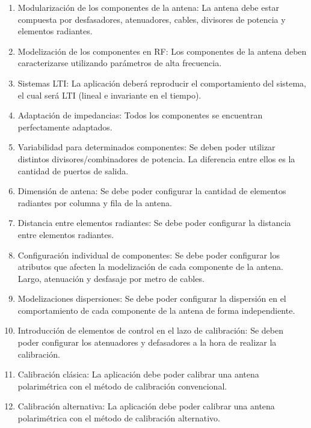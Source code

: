 \begin{enumerate}
    \item Modularización de los componentes de la antena: La antena debe estar compuesta por desfasadores, atenuadores, cables,
		divisores de potencia y elementos radiantes.

	\item Modelización de los componentes en RF: Los componentes de la antena deben caracterizarse utilizando parámetros de alta
		frecuencia.

    \item Sistemas LTI: La aplicación deberá reproducir el comportamiento del sistema, el cual será LTI (lineal e invariante
		en el tiempo).

	\item Adaptación de impedancias: Todos los componentes se encuentran perfectamente adaptados.

    \item Variabilidad para determinados componentes: Se deben poder utilizar distintos divisores/combinadores de potencia.
		La diferencia entre ellos es la cantidad de puertos de salida.

    \item Dimensión de antena: Se debe poder configurar la cantidad de elementos radiantes por columna y fila de la antena.
    \item Distancia entre elementos radiantes: Se debe poder configurar la distancia entre elementos radiantes.
    \item Configuración individual de componentes: Se debe poder configurar los atributos que afecten la modelización de cada
		componente de la antena. Largo, atenuación y desfasaje por metro de cables.

    \item Modelizaciones dispersiones: Se debe poder configurar la dispersión en el comportamiento de cada componente de la
		antena de forma independiente.

    \item Introducción de elementos de control en el lazo de calibración: Se deben poder configurar los atenuadores y
		defasadores a la hora de realizar la calibración.

    \item Calibración clásica: La aplicación debe poder calibrar una antena polarimétrica con el método de calibración convencional.

    \item Calibración alternativa: La aplicación debe poder calibrar una antena polarimétrica con el método de calibración alternativo.


\end{enumerate}
